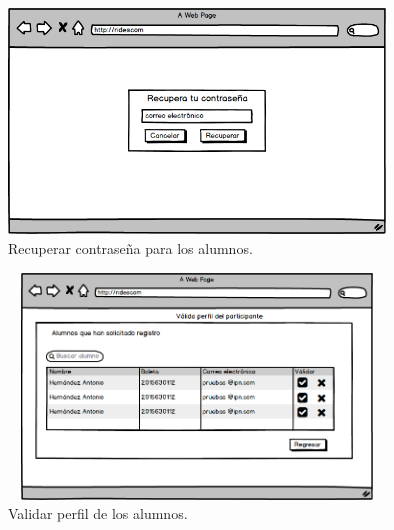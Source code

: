 \begin{figure}[hbt!]
	\centering
	\includegraphics[width=10cm, height=6cm]{Imagenes/Disenos/VistasBorradas/p5Recuperarcontrasena.png}
	\caption{Recuperar contraseña para los alumnos.}
\end{figure}

\begin{figure}[hbt!]
	\centering
	\includegraphics[width=10cm, height=6cm]{Imagenes/Disenos/VistasBorradas/p18ValidaPerfil.png}
	\caption{Validar perfil de los alumnos.}
\end{figure}
\pagebreak

